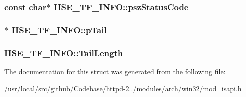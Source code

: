 \subsubsection[{\texorpdfstring{psz\+Status\+Code}{pszStatusCode}}]{\setlength{\rightskip}{0pt plus 5cm}const char$\ast$ H\+S\+E\+\_\+\+T\+F\+\_\+\+I\+N\+F\+O\+::psz\+Status\+Code}\hypertarget{structHSE__TF__INFO_a481dded9279f577c79fe45a73469dd17}{}\label{structHSE__TF__INFO_a481dded9279f577c79fe45a73469dd17}
\subsubsection[{\texorpdfstring{p\+Tail}{pTail}}]{$\ast$ H\+S\+E\+\_\+\+T\+F\+\_\+\+I\+N\+F\+O\+::p\+Tail}\hypertarget{structHSE__TF__INFO_a796e0b1293dee6b34a3ef4be5e19a95e}{}\label{structHSE__TF__INFO_a796e0b1293dee6b34a3ef4be5e19a95e}
\subsubsection[{\texorpdfstring{Tail\+Length}{TailLength}}]{ H\+S\+E\+\_\+\+T\+F\+\_\+\+I\+N\+F\+O\+::\+Tail\+Length}\hypertarget{structHSE__TF__INFO_a652100b5362a06b7c06e6c97cfd8d064}{}\label{structHSE__TF__INFO_a652100b5362a06b7c06e6c97cfd8d064}


The documentation for this struct was generated from the following file\+:\begin{DoxyCompactItemize}
\item 
/usr/local/src/github/\+Codebase/httpd-\/2../modules/arch/win32/\hyperlink{mod__isapi_8h}{mod\+\_\+isapi.\+h}\end{DoxyCompactItemize}
